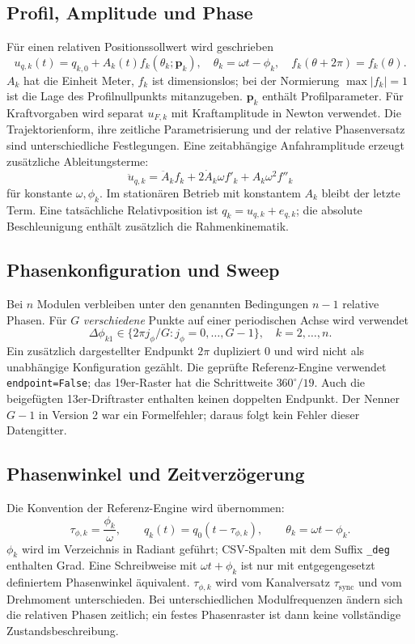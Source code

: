 \documentclass[11pt,a4paper]{article}
\begin{document}
\subsection{Profil, Amplitude und Phase}
Für einen relativen Positionssollwert wird geschrieben
\begin{equation}
u_{q,k}(t)=q_{k,0}+A_k(t)f_k(\theta_k;\mathbf p_k),\quad
\theta_k=\omega t-\phi_k,\quad f_k(\theta+2\pi)=f_k(\theta).
\end{equation}
$A_k$ hat die Einheit Meter, $f_k$ ist dimensionslos; bei der Normierung $\max|f_k|=1$ ist die Lage des Profilnullpunkts mitanzugeben. $\mathbf p_k$ enthält Profilparameter. Für Kraftvorgaben wird separat $u_{F,k}$ mit Kraftamplitude in Newton verwendet.
Die Trajektorienform, ihre zeitliche Parametrisierung und der relative Phasenversatz sind unterschiedliche Festlegungen. Eine zeitabhängige Anfahramplitude erzeugt zusätzliche Ableitungsterme:
\begin{equation}
\ddot u_{q,k}=\ddot A_k f_k+2\dot A_k\omega f'_k+A_k\omega^2f''_k
\end{equation}
für konstante $\omega,\phi_k$. Im stationären Betrieb mit konstantem $A_k$ bleibt der letzte Term. Eine tatsächliche Relativposition ist $q_k=u_{q,k}+e_{q,k}$; die absolute Beschleunigung enthält zusätzlich die Rahmenkinematik.

\subsection{Phasenkonfiguration und Sweep}
Bei $n$ Modulen verbleiben unter den genannten Bedingungen $n-1$ relative Phasen. Für $G$ \emph{verschiedene} Punkte auf einer periodischen Achse wird verwendet
\begin{equation}
\Delta\phi_{k1}\in\{2\pi j_\phi/G:j_\phi=0,\ldots,G-1\},\quad k=2,\ldots,n.
\end{equation}
Ein zusätzlich dargestellter Endpunkt $2\pi$ dupliziert $0$ und wird nicht als unabhängige Konfiguration gezählt. Die geprüfte Referenz-Engine verwendet \texttt{endpoint=False}; das 19er-Raster hat die Schrittweite $360^\circ/19$. Auch die beigefügten 13er-Driftraster enthalten keinen doppelten Endpunkt. Der Nenner $G-1$ in Version 2 war ein Formelfehler; daraus folgt kein Fehler dieser Datengitter.


\subsection{Phasenwinkel und Zeitverzögerung}
Die Konvention der Referenz-Engine wird übernommen:
\[
\tau_{\phi,k}=\frac{\phi_k}{\omega},\qquad q_k(t)=q_0(t-\tau_{\phi,k}),\qquad
\theta_k=\omega t-\phi_k.
\]
$\phi_k$ wird im Verzeichnis in Radiant geführt; CSV-Spalten mit dem Suffix \texttt{\_deg} enthalten Grad. Eine Schreibweise mit $\omega t+\phi_k$ ist nur mit entgegengesetzt definiertem Phasenwinkel äquivalent. $\tau_{\phi,k}$ wird vom Kanalversatz $\tau_{\mathrm{sync}}$ und vom Drehmoment unterschieden. Bei unterschiedlichen Modulfrequenzen ändern sich die relativen Phasen zeitlich; ein festes Phasenraster ist dann keine vollständige Zustandsbeschreibung.
\end{document}
